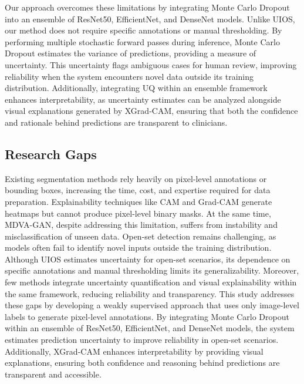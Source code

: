 Our approach overcomes these limitations by integrating Monte Carlo Dropout into an ensemble of ResNet50, EfficientNet, and DenseNet models. Unlike UIOS, our method does not require specific annotations or manual thresholding. By performing multiple stochastic forward passes during inference, Monte Carlo Dropout estimates the variance of predictions, providing a measure of uncertainty. This uncertainty flags ambiguous cases for human review, improving reliability when the system encounters novel data outside its training distribution. Additionally, integrating UQ within an ensemble framework enhances interpretability, as uncertainty estimates can be analyzed alongside visual explanations generated by XGrad-CAM, ensuring that both the confidence and rationale behind predictions are transparent to clinicians.

\subsection{Research Gaps}

Existing segmentation methods rely heavily on pixel-level annotations or bounding boxes, increasing the time, cost, and expertise required for data preparation. Explainability techniques like CAM and Grad-CAM generate heatmaps but cannot produce pixel-level binary masks. At the same time, MDVA-GAN, despite addressing this limitation, suffers from instability and misclassification of unseen data. Open-set detection remains challenging, as models often fail to identify novel inputs outside the training distribution. Although UIOS estimates uncertainty for open-set scenarios, its dependence on specific annotations and manual thresholding limits its generalizability. Moreover, few methods integrate uncertainty quantification and visual explainability within the same framework, reducing reliability and transparency. This study addresses these gaps by developing a weakly supervised approach that uses only image-level labels to generate pixel-level annotations. By integrating Monte Carlo Dropout within an ensemble of ResNet50, EfficientNet, and DenseNet models, the system estimates prediction uncertainty to improve reliability in open-set scenarios. Additionally, XGrad-CAM enhances interpretability by providing visual explanations, ensuring both confidence and reasoning behind predictions are transparent and accessible.